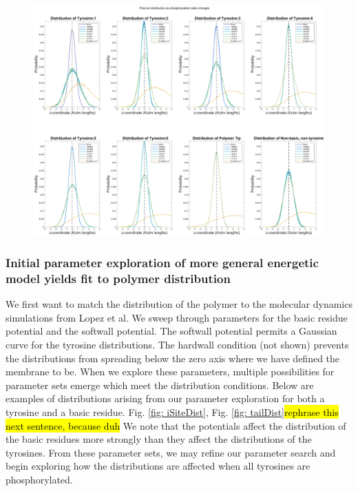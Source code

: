 \documentclass[../../AdvancementSummary.tex]{subfiles}
\begin{document}
{\begin{figure}[H]
\begin{center}
\includegraphics[width=\linewidth]{ResultsFigures/CD3ZetaSoftwallPiecewiseBasicsY/Phosphorylation/iSiteDistribution135624.eps}
\end{center}
\caption{\label{fig: Dist135624}}
\end{figure}

\subsubsection{Initial parameter exploration of more general energetic model yields fit to polymer distribution}

We first want to match the distribution of the polymer to the molecular dynamics simulations from Lopez et al. We sweep through parameters for the basic residue potential and the softwall potential. The softwall potential permits a Gaussian curve for the tyrosine distributions.  The hardwall condition (not shown) prevents the distributions from spreading below the zero axis where we have defined the membrane to be. When we explore these parameters, multiple possibilities for parameter sets emerge which meet the distribution conditions. Below are examples of distributions arising from our parameter exploration for both a tyrosine and a basic residue. Fig. \ref{fig: iSiteDist}, Fig. \ref{fig: tailDist}\hl{rephrase this next sentence, because duh} We note that the potentials affect the distribution of the basic residues more strongly than they affect the distributions of the tyrosines. From these parameter sets, we may refine our parameter search and begin exploring how the distributions are affected when all tyrosines are phosphorylated. 

}
\end{document}

